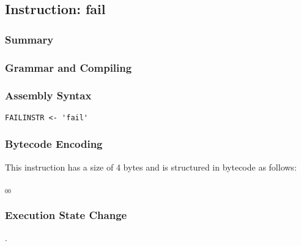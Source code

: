\subsection{Instruction: fail}

\subsubsection{Summary}


\subsubsection{Grammar and Compiling}


\subsubsection{Assembly Syntax}

\begin{myquote}
\begin{verbatim}
FAILINSTR <- 'fail'
\end{verbatim}
\end{myquote}


\subsubsection{Bytecode Encoding}

This instruction has a size of 4 bytes and is structured in bytecode as follows:

$_{00}$\ 


\subsubsection{Execution State Change}

.


